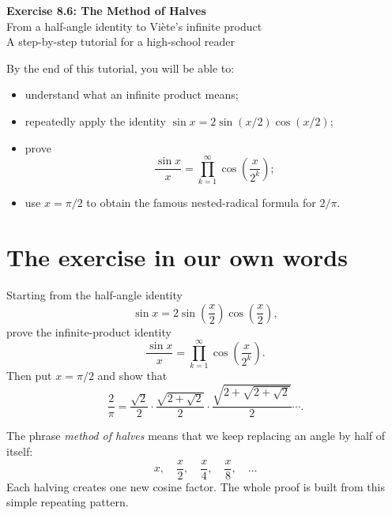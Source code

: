 \documentclass[11pt]{article}
\begin{document}
\begin{center}
  {\LARGE\bfseries Exercise 8.6: The Method of Halves}\\[0.35em]
  {\Large From a half-angle identity to Vi\`ete's infinite product}\\[0.7em]
  {\large A step-by-step tutorial for a high-school reader}
\end{center}

\vspace{0.4em}

\begin{ideaBox}
By the end of this tutorial, you will be able to:
\begin{itemize}
  \item understand what an infinite product means;
  \item repeatedly apply the identity \(\sin x=2\sin(x/2)\cos(x/2)\);
  \item prove
  \[
    \frac{\sin x}{x}=\prod_{k=1}^{\infty}\cos\!\left(\frac{x}{2^k}\right);
  \]
  \item use \(x=\pi/2\) to obtain the famous nested-radical formula for \(2/\pi\).
\end{itemize}
\end{ideaBox}

\tableofcontents
\newpage

\section{The exercise in our own words}

\begin{problemBox}
Starting from the half-angle identity
\[
  \sin x=2\sin\!\left(\frac{x}{2}\right)
              \cos\!\left(\frac{x}{2}\right),
\]
prove the infinite-product identity
\[
  \boxed{\displaystyle
  \frac{\sin x}{x}=\prod_{k=1}^{\infty}
  \cos\!\left(\frac{x}{2^k}\right)}.
\]
Then put \(x=\pi/2\) and show that
\[
\boxed{\displaystyle
\frac{2}{\pi}
=\frac{\sqrt2}{2}\cdot
 \frac{\sqrt{2+\sqrt2}}{2}\cdot
 \frac{\sqrt{2+\sqrt{2+\sqrt2}}}{2}\cdots .}
\]
\end{problemBox}

The phrase \emph{method of halves} means that we keep replacing an angle by half of itself:
\[
 x,\quad \frac{x}{2},\quad \frac{x}{4},\quad
 \frac{x}{8},\quad \ldots
\]
Each halving creates one new cosine factor. The whole proof is built from this simple repeating pattern.
\end{document}
